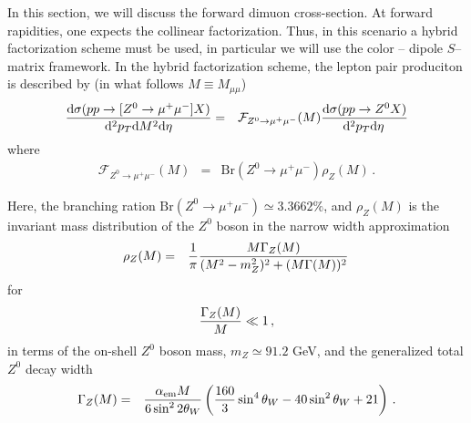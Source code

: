 \documentclass[aps,prd,preprint,superscriptaddress,nofootinbib]{revtex4-2}
\renewcommand{\dd}{\mathrm{d}}
\begin{document}
In this section, we will discuss the forward dimuon cross-section. At forward rapidities, one expects the collinear factorization. Thus, in this scenario a hybrid factorization scheme must be used, in particular we will use the color -- dipole $S$--matrix framework. In the hybrid factorization scheme, the lepton pair produciton is described by (in what follows $M \equiv M_{\mu\mu}$)
\begin{eqnarray}\label{sig-tot}
	{ \dd \sigma(pp\rightarrow [Z^0 \rightarrow \mu^+\mu^-]X) \over \dd^2 p_T \dd M^2 \dd \eta } &=& 
	\mathcal{F}_{Z^0 \rightarrow \mu^+\mu^-}(M)
	{ \dd \sigma(pp \rightarrow Z^0 X)
	\over 
	  \dd^2 p_T \dd \eta \, 
	}
\end{eqnarray}
where 
\begin{eqnarray}
	\mathcal{F}_{Z^0 \rightarrow \mu^+\mu^-}(M) & = &
	\mathrm{Br}(Z^0 \rightarrow \mu^+\mu^-) \rho_Z(M)\, .
\end{eqnarray}
\par 
Here, the branching ration $\mathrm{Br}(Z^0 \rightarrow \mu^+\mu^-) \simeq 3.3662 \%$, and $\rho_Z(M)$ is the invariant mass distribution of the $Z^0$ boson in the narrow width approximation
\begin{eqnarray}
	\rho_Z(M) &=& {1\over \pi}
	{ M\Gamma_Z(M)
	\over 
	(M^2 - m^2_Z)^2 + (M\Gamma(M))^2
	}\, 
\end{eqnarray}
for 
\begin{eqnarray}
{\Gamma_Z(M) \over M} \ll 1 \,,
\end{eqnarray}
in terms of the on-shell $Z^0$ boson mass, $m_Z \simeq 91.2$ GeV, and the generalized total $Z^0$ decay width 
\begin{eqnarray}
	\Gamma_Z(M) &=& {\alpha_{\text{em}} M \over 6\sin^2 2\theta_W }
	\left( 
		{160 \over 3} \sin^4 \theta_W - 40\sin^2 \theta_W + 21
	\right) \, .
\end{eqnarray}
\end{document}
